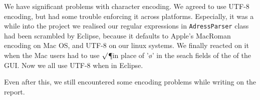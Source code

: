 
We have significant problems with character encoding. We agreed to use UTF-8 encoding, but had some trouble enforcing it across platforms. Especially, it was a while into the project we realised our regular expressions in \texttt{AdressParser} class had been scrambled by Eclipse, because it defaults to Apple's MacRoman encoding on Mac OS, and UTF-8 on our linux systems. 
We finally reacted on it when the Mac users had to use $\surd$\P in place of 'ø' in the seach fields of the of the GUI. Now we all use UTF-8 when in Eclipse. 

Even after this, we still encountered some encoding problems while writing on the report.
